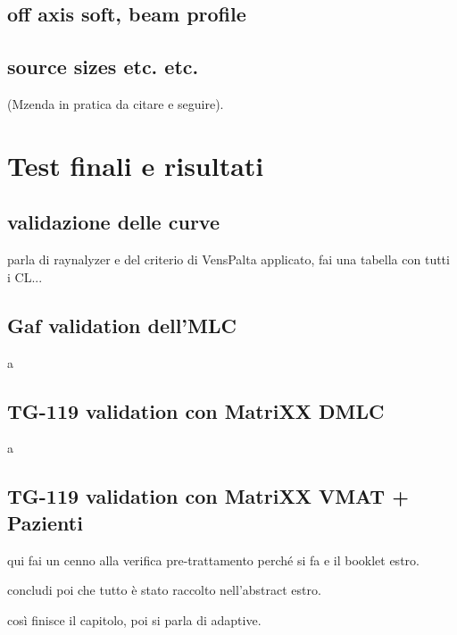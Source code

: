 \subsection{off axis soft, beam profile}
\subsection{source sizes etc. etc.}
(Mzenda in pratica da citare e seguire).


\section{Test finali e risultati}
\subsection{validazione delle curve}
parla di raynalyzer e del criterio di VensPalta applicato, fai una tabella con tutti i CL...
\subsection{Gaf validation dell'MLC}
a
\subsection{TG-119 validation con MatriXX DMLC}
a
\subsection{TG-119 validation con MatriXX VMAT + Pazienti}
qui fai un cenno alla verifica pre-trattamento perché si fa e il booklet estro.

concludi poi che tutto è stato raccolto nell'abstract estro.

così finisce il capitolo, poi si parla di adaptive.















